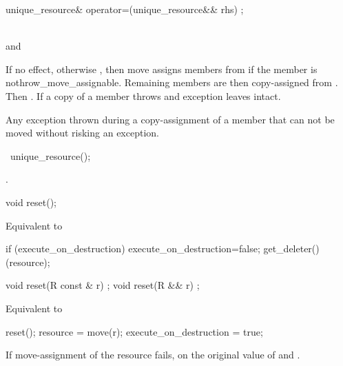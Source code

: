 \documentclass[ebook,11pt,article]{memoir}
\begin{document}
\begin{itemdecl}
unique_resource& operator=(unique_resource&& rhs) ;
\end{itemdecl}

\begin{itemdescr}
\pnum
\requires \\
and\\

\pnum
\effects If  no effect, otherwise , then move assigns members from  if the member is nothrow_move_assignable. Remaining members are then copy-assigned from . Then . If a copy of a member throws and exception leaves  intact.

\pnum
\throws Any exception thrown during a copy-assignment of a member that can not be moved without risking an exception.
\end{itemdescr}

\begin{itemdecl}
~unique_resource();
\end{itemdecl}

\begin{itemdescr}
\pnum
\effects {}.
\end{itemdescr}

\begin{itemdecl}
void reset();
\end{itemdecl}

\begin{itemdescr}
\pnum
\effects Equivalent to
\begin{codeblock}
  if (execute_on_destruction) {
    execute_on_destruction=false;
    get_deleter()(resource);
  }
\end{codeblock}
\end{itemdescr}

\begin{itemdecl}
void reset(R const & r) ;
void reset(R && r) ;
\end{itemdecl}

\begin{itemdescr}
\pnum
\effects Equivalent to
\begin{codeblock}
  reset();
  resource = move(r);
  execute_on_destruction = true;
\end{codeblock}
If move-assignment of the resource fails,  on the original value of  and .
\end{itemdescr}
\end{document}
